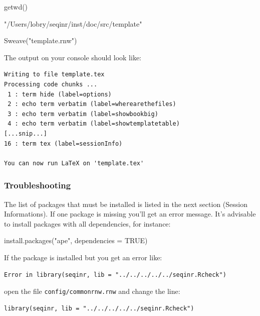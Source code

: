 \documentclass{article}
\begin{document}
\begin{Schunk}
\begin{Sinput}
 getwd()
\end{Sinput}
\begin{Soutput}
[1] "/Users/lobry/seqinr/inst/doc/src/template"
\end{Soutput}
\end{Schunk}
\begin{Schunk}
\begin{Sinput}
 Sweave("template.rnw")
\end{Sinput}
\end{Schunk}

The output on your \Rlogo{} console should look like:

\begin{verbatim}
Writing to file template.tex
Processing code chunks ...
 1 : term hide (label=options)
 2 : echo term verbatim (label=wherearethefiles)
 3 : echo term verbatim (label=showbookbig)
 4 : echo term verbatim (label=showtemplatetable)
[...snip...]
16 : term tex (label=sessionInfo)

You can now run LaTeX on 'template.tex'
\end{verbatim}

\subsubsection{Troubleshooting}

The list of \Rlogo{} packages that must be installed is listed
in the next section (Session Informations). 
If one package is missing you'll get an error message.
It's advisable to install packages with all dependencies, for instance:

\begin{Schunk}
\begin{Sinput}
 install.packages("ape", dependencies = TRUE)
\end{Sinput}
\end{Schunk}

If the \seqinr{} package is installed but you get an error like:

\begin{verbatim}
Error in library(seqinr, lib = "../../../../../seqinr.Rcheck")
\end{verbatim}

open the file \texttt{config/commonrnw.rnw} and change the line:

\begin{verbatim}
library(seqinr, lib = "../../../../../seqinr.Rcheck")
\end{verbatim}
\end{document}
